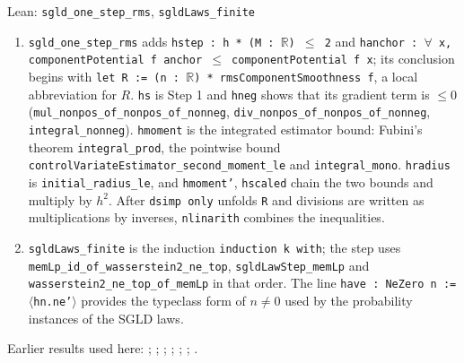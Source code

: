 \documentclass[11pt,a4paper]{report}
\begin{document}
\begin{leanbox}{Lean: \texttt{sgld\_\allowbreak{}one\_\allowbreak{}step\_\allowbreak{}rms}, \texttt{sgldLaws\_\allowbreak{}finite}}
\begin{enumerate}
\item \texttt{sgld\_\allowbreak{}one\_\allowbreak{}step\_\allowbreak{}rms} adds \texttt{hstep : h * (M : \ensuremath{\mathbb R}) \ensuremath{\le} 2} and \texttt{hanchor : \ensuremath{\forall} x, component\allowbreak{}Potential f anchor \ensuremath{\le} component\allowbreak{}Potential f x}; its conclusion begins with \texttt{let R := (n : \ensuremath{\mathbb R}) * rms\allowbreak{}Component\allowbreak{}Smoothness f}, a local abbreviation for \(R\). \texttt{hs} is Step 1 and \texttt{hneg} shows that its gradient term is \(\le0\) (\texttt{mul\_\allowbreak{}nonpos\_\allowbreak{}of\_\allowbreak{}nonpos\_\allowbreak{}of\_\allowbreak{}nonneg}, \texttt{div\_\allowbreak{}nonpos\_\allowbreak{}of\_\allowbreak{}nonpos\_\allowbreak{}of\_\allowbreak{}nonneg}, \texttt{integral\_\allowbreak{}nonneg}). \texttt{hmoment} is the integrated estimator bound: Fubini's theorem \texttt{integral\_\allowbreak{}prod}, the pointwise bound \texttt{control\allowbreak{}Variate\allowbreak{}Estimator\_\allowbreak{}second\_\allowbreak{}moment\_\allowbreak{}le} and \texttt{integral\_\allowbreak{}mono}. \texttt{hradius} is \texttt{initial\_\allowbreak{}radius\_\allowbreak{}le}, and \texttt{hmoment'}, \texttt{hscaled} chain the two bounds and multiply by \(h^2\). After \texttt{dsimp only} unfolds \texttt{R} and divisions are written as multiplications by inverses, \texttt{nlinarith} combines the inequalities.

\item \texttt{sgld\allowbreak{}Laws\_\allowbreak{}finite} is the induction \texttt{induction k with}; the step uses \texttt{mem\allowbreak{}Lp\_\allowbreak{}id\_\allowbreak{}of\_\allowbreak{}wasserstein2\_\allowbreak{}ne\_\allowbreak{}top}, \texttt{sgld\allowbreak{}Law\allowbreak{}Step\_\allowbreak{}mem\allowbreak{}Lp} and \texttt{wasserstein2\_\allowbreak{}ne\_\allowbreak{}top\_\allowbreak{}of\_\allowbreak{}mem\allowbreak{}Lp} in that order. The line \texttt{have : Ne\allowbreak{}Zero n := \ensuremath{\langle}hn.\allowbreak{}ne'\ensuremath{\rangle}} provides the typeclass form of \(n\ne0\) used by the probability instances of the SGLD laws.

\end{enumerate}
\end{leanbox}


Earlier results used here: \cite[Section~3.17.3]{LangevinLean2026ULASC}; \cite[Section~3.17.4]{LangevinLean2026ULASC}; \cite[Section~3.21.1]{LangevinLean2026ULASC}; \cite[Section~3.21.2]{LangevinLean2026ULASC}; \cite[Section~3.26.13]{LangevinLean2026ULASC}; \cite[Section~3.26.15]{LangevinLean2026ULASC}; \cite[Section~3.26.3]{LangevinLean2026ULASC}.
\end{document}
